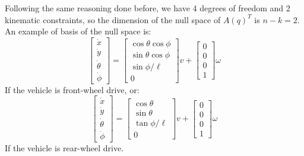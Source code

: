 Following the same reasoning done before, we have 4 degrees of freedom and 2 kinematic constraints, so the dimension of the null space of $A(q)^T$ is $n-k= 2$. An example of basis of the null space is:
\begin{equation}
\left[ 
\begin{matrix}
\dot{x} \\ 	\dot{y} \\ 	\dot{\theta} \\	\dot{\phi} 
\end{matrix}
\right] = \left[
\begin{matrix}
\cos\theta\cos\phi \\ \sin\theta\cos\phi \\ \sin\phi/\ell \\ 0 
\end{matrix}
\right] v+ \left[
\begin{matrix}
0 \\0 \\0 \\1
\end{matrix}
\right] \omega
\end{equation}
If the vehicle is front-wheel drive, or:
\begin{equation}
\left[ 
\begin{matrix}
\dot{x} \\ 	\dot{y} \\ 	\dot{\theta} \\	\dot{\phi} 
\end{matrix}
\right] = \left[
\begin{matrix}
\cos\theta \\ \sin\theta \\ \tan\phi/\ell \\ 0 
\end{matrix}
\right] v+ \left[
\begin{matrix}
0 \\0 \\0 \\1
\end{matrix}
\right] \omega
\end{equation}
If the vehicle is rear-wheel drive.

